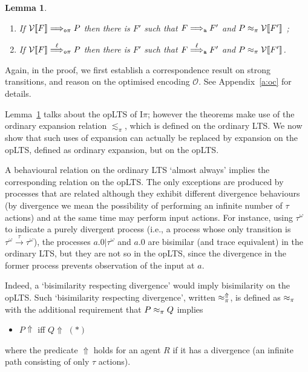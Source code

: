 \documentclass[11pt,a4paper]{amsart}
\theoremstyle{plain}
\theoremstyle{definition}
\theoremstyle{defC}
\theoremstyle{thmC}
\theoremstyle{plain}
\numberwithin{equation}{section}
\def\nil{0}
\newcommand{\rmm}[1]{{\tt{\lowercase{#1}}}}
\newcommand{\genarr}[2]{\mathrel{\stackrel{{#1}}{\longrightarrow}_{\rmm{\lowercase{#2}}}}}
\newcommand{\genArr}[2]{\mathrel{\stackrel{{#1}}{\Longrightarrow}_{\rmm{\lowercase{#2}}}}}  %
\newcommand{\genLongrightarrow}[1]{\mathrel{\Longrightarrow_{\rmm{\lowercase{#1}}}}}
\newcommand{\ArrA}[1]{\genArr{#1}{A}}  %
\newcommand{\LongrightarrowA}{\genLongrightarrow{A}}
\newcommand{\arrN}[1]{\genarr{#1}{o\pi}}  %
\newcommand{\ArrN}[1]{\genArr{#1}{o\pi}}  %
\newcommand{\arr}[1]{\mathrel{\stackrel{{#1}}{\longrightarrow}}}  %
\newcommand{\opLTS}{opLTS\xspace}  %
\newcommand{\genwb}[1]{\mathrel{\approx_{\rmm{\lowercase{#1}}}}}       %
\newcommand{\wbPI}{\genwb{\pi}}       %
\newcommand{\genwbDIV}[2]{\mathrel{\approx^{#2}_{\rmm{\lowercase{#1}}}}}
\newcommand{\wbPIDIV}{\genwbDIV{\pi}{\Uparrow}}       %
\newcommand{\expa}{\mathrel{\lesssim_{\pi}}}
\newcommand{\FF}{F}
\newcommand{\PP}{P}
\newcommand{\cbvSymb}{{\mathcal {V}}}
\newcommand{\encoEnvI}[1]{ \cbvSymb[\! [ #1 ] \! ]  } %
\newcommand{\encoConI}{\encoEnvI} %
\newcommand{\encoEnvV}[1]{{\mathcal {O}} [\! [ #1 ] \! ]  } %
\newcommand{\encoConV}{\encoEnvV} %
\newcommand{\qencV}{{\mathcal O}}  %
\newcommand{\Intp}{\mbox{I$\pi$}\xspace}   %
\newcommand{\piI}{\Intp}   %
\newcommand{\initName}{}
\theoremstyle{plain}
\newtheorem{theorem}[thm]{Theorem}
\newtheorem{lemma}[thm]{Lemma}
\theoremstyle{definition}
\begin{document}
\begin{lemma} %
\label{l:opcorrCON3_w}
$ $ \begin{enumerate}


\item If 
$ \encoConI \FF \ArrN {} \PP$ then there is $\FF'$ such that 
$\FF \LongrightarrowA \FF'$  and  
$\PP  \wbPI \encoConI {\FF'}$ ; 


\item If
$ \encoConI \FF \ArrN\ell \PP$
 then there is $\FF'$ such that
 $\FF \ArrA\ell \FF'$
and $\PP \wbPI \encoConI {\FF'}$.
\end{enumerate} 
\end{lemma} 

\noindent
Again, in the proof,  we first establish a correspondence result on strong transitions,
and reason on the optimised encoding $\qencV$. 
See Appendix~\ref{a:oc} for details.


Lemma~\ref{l:opcorrCON3_w}  
talks about the \opLTS of \piI;
  however the theorems make use of the
ordinary expansion relation  $\expa $, which is defined on the ordinary LTS. 
We now show that 
such uses of
expansion can actually be replaced by expansion on the \opLTS, defined as ordinary
expansion, but on the \opLTS.

A behavioural relation on the ordinary LTS `almost always' implies the corresponding
relation on the \opLTS.  The only exceptions are produced by processes that are related
although they exhibit different divergence behaviours (by divergence we mean the
possibility of performing an infinite number of $\tau$ actions) and at the same time may
perform input actions. For instance, using $\tau^\omega$ to indicate a purely divergent
process  (i.e., a process whose only transition is $\tau^\omega \arr\tau \tau^\omega$), 
 the processes $a.\nil | \tau^\omega $ and $a.\nil$ are  bisimilar (and trace equivalent)
 in the ordinary LTS, but they are not so in the \opLTS, since the divergence in the former
 process prevents observation of the input at $a$. 


Indeed, a `bisimilarity respecting divergence' would imply bisimilarity on the \opLTS. 
Such  `bisimilarity respecting divergence', written $\wbPIDIV$, is defined as $\wbPI$ with
the additional requirement that $P \wbPI Q$ implies 
\begin{itemize}
\item
$P \Uparrow $ iff  $Q \Uparrow $ \hfill $(*)$
\end{itemize} 
where the predicate $ \Uparrow $ holds for an  agent $R$  if it
has a divergence (an infinite path 
consisting of only $\tau$ actions). 
\end{document}
